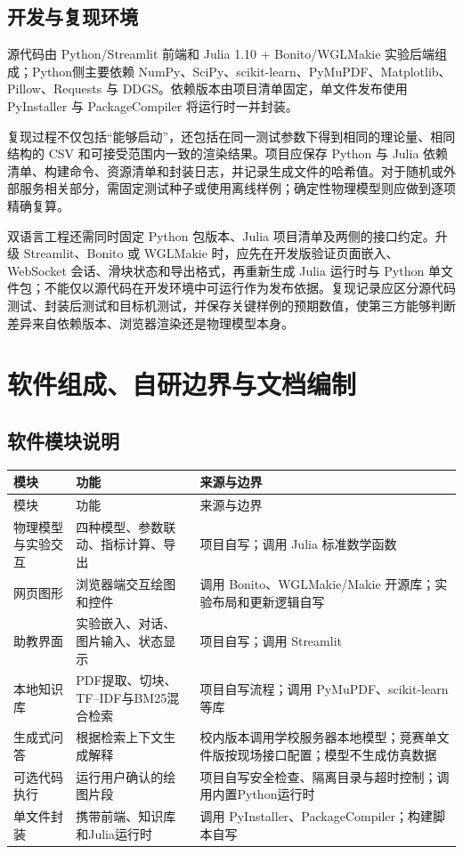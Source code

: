 \documentclass[UTF8,a4paper,zihao=-4]{ctexart}
\begin{document}
\subsection{开发与复现环境}
源代码由 Python/Streamlit 前端和 Julia 1.10 + Bonito/WGLMakie 实验后端组成；Python侧主要依赖 NumPy、SciPy、scikit-learn、PyMuPDF、Matplotlib、Pillow、Requests 与 DDGS。依赖版本由项目清单固定，单文件发布使用 PyInstaller 与 PackageCompiler 将运行时一并封装。

复现过程不仅包括“能够启动”，还包括在同一测试参数下得到相同的理论量、相同结构的 CSV 和可接受范围内一致的渲染结果。项目应保存 Python 与 Julia 依赖清单、构建命令、资源清单和封装日志，并记录生成文件的哈希值。对于随机或外部服务相关部分，需固定测试种子或使用离线样例；确定性物理模型则应做到逐项精确复算。

双语言工程还需同时固定 Python 包版本、Julia 项目清单及两侧的接口约定。升级 Streamlit、Bonito 或 WGLMakie 时，应先在开发版验证页面嵌入、WebSocket 会话、滑块状态和导出格式，再重新生成 Julia 运行时与 Python 单文件包；不能仅以源代码在开发环境中可运行作为发布依据。复现记录应区分源代码测试、封装后测试和目标机测试，并保存关键样例的预期数值，使第三方能够判断差异来自依赖版本、浏览器渲染还是物理模型本身。

\section{软件组成、自研边界与文档编制}

\subsection{软件模块说明}
\begin{longtable}{p{3.4cm}p{5.2cm}p{5.0cm}}
\toprule
模块 & 功能 & 来源与边界\\
\midrule
\endfirsthead
\toprule
模块 & 功能 & 来源与边界\\
\midrule
\endhead
物理模型与实验交互 & 四种模型、参数联动、指标计算、导出 & 项目自写；调用 Julia 标准数学函数\\
网页图形 & 浏览器端交互绘图和控件 & 调用 Bonito、WGLMakie/Makie 开源库；实验布局和更新逻辑自写\\
助教界面 & 实验嵌入、对话、图片输入、状态显示 & 项目自写；调用 Streamlit\\
本地知识库 & PDF提取、切块、TF--IDF与BM25混合检索 & 项目自写流程；调用 PyMuPDF、scikit-learn 等库\\
生成式问答 & 根据检索上下文生成解释 & 校内版本调用学校服务器本地模型；竞赛单文件版按现场接口配置；模型不生成仿真数据\\
可选代码执行 & 运行用户确认的绘图片段 & 项目自写安全检查、隔离目录与超时控制；调用内置Python运行时\\
单文件封装 & 携带前端、知识库和Julia运行时 & 调用 PyInstaller、PackageCompiler；构建脚本自写\\
\bottomrule
\end{longtable}
\end{document}
